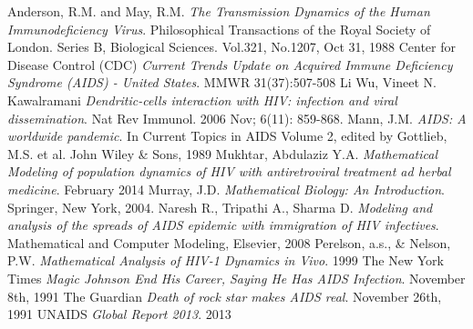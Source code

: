 \begin{thebibliography}{9}
	Anderson, R.M. and May, R.M. 
	\textit{The Transmission Dynamics of the Human Immunodeficiency Virus}.
	Philosophical Transactions of the Royal Society of London. Series B, Biological Sciences. Vol.321, No.1207, Oct 31, 1988
	Center for Disease Control (CDC)
	\textit{Current Trends Update on Acquired Immune Deficiency Syndrome (AIDS) - United States}.
	MMWR 31(37):507-508
	Li Wu, Vineet N. Kawalramani 
	\textit{Dendritic-cells interaction with HIV: infection and viral dissemination}.
	Nat Rev Immunol. 2006 Nov; 6(11): 859-868.
	Mann, J.M.
	\textit{AIDS: A worldwide pandemic}.
	In Current Topics in AIDS Volume 2, edited by Gottlieb, M.S. et al. John Wiley \& Sons, 1989
	Mukhtar, Abdulaziz Y.A.
	\textit{Mathematical Modeling of population dynamics of HIV with antiretroviral treatment ad herbal medicine}.
	February 2014
	Murray, J.D. 
	\textit{Mathematical Biology: An Introduction}.
	Springer, New York, 2004.
	Naresh R., Tripathi A., Sharma D.
	\textit{Modeling and analysis of the spreads of AIDS epidemic with immigration of HIV infectives}.
	Mathematical and Computer Modeling, Elsevier, 2008
	Perelson, a.s., \& Nelson, P.W.
	\textit{Mathematical Analysis of HIV-1 Dynamics in Vivo}.
	1999
	The New York Times
	\textit{Magic Johnson End His Career, Saying He Has AIDS Infection}.
	November 8th, 1991
	The Guardian
	\textit{Death of rock star makes AIDS real}.
	November 26th, 1991
	UNAIDS
	\textit{Global Report 2013}.
	2013

\end{thebibliography}
